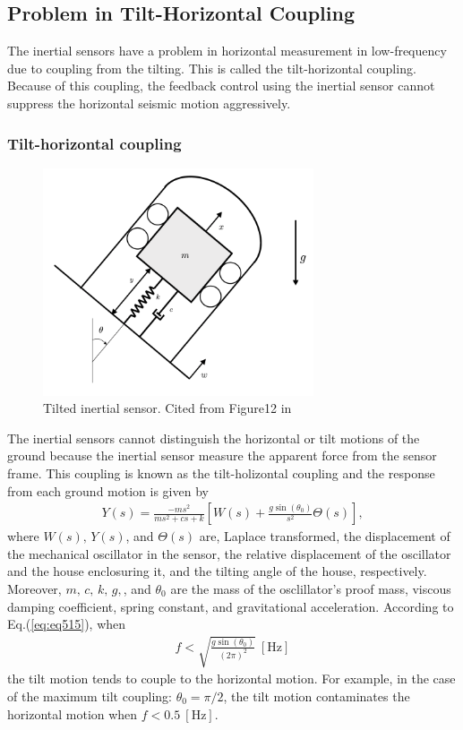 \subsection{Problem in Tilt-Horizontal Coupling}
The inertial sensors have a problem in horizontal measurement in low-frequency due to coupling from the tilting. This is called the tilt-horizontal coupling. Because of this coupling, the feedback control using the inertial sensor cannot suppress the horizontal seismic motion aggressively.

\subsubsection{Tilt-horizontal coupling}
\begin{figure}[h]
  \begin{center}   
    \includegraphics[width=8cm]{./img_chap5/img509.png}
    \caption{Tilted inertial sensor. Cited from Figure12 in \cite{collette2012inertial}} \label{img:img509}
  \end{center}
\end{figure}
 The inertial sensors cannot distinguish the horizontal or tilt motions of the ground because the inertial sensor measure the apparent force from the sensor frame. This coupling is known as the tilt-holizontal coupling and the response from each ground motion is given by \cite{collette2012inertial}
\begin{eqnarray}
  Y(s)=\frac{-m s^{2}}{m s^{2}+c s+k} \left[ W(s) + \frac{g \sin \left(\theta_{0}\right)}{s^2} \Theta(s) \right] \label{eq:eq515},
\end{eqnarray}
where $W(s),\,Y(s)$, and $\Theta(s)$ are, Laplace transformed, the displacement of the mechanical oscillator in the sensor, the relative displacement of the oscillator and the house enclosuring it, and the tilting angle of the house, respectively. Moreover, $m,\,c,\,k,\,g,$, and $\theta_0$ are the mass of the osclillator's proof mass, viscous damping coefficient, spring constant, and gravitational acceleration. According to Eq.(\ref{eq:eq515}), when 
\begin{eqnarray}
  f < \sqrt{\frac{g\sin(\theta_0)}{(2\pi)^2}}\ [\mathrm{Hz}]
  \label{eq:eq515}
\end{eqnarray}
the tilt motion tends to couple to the horizontal motion. For example, in the case of the maximum tilt coupling: $\theta_0=\pi/2$, the tilt motion contaminates the horizontal motion when $f<0.5\ [\mathrm{Hz}]$.

